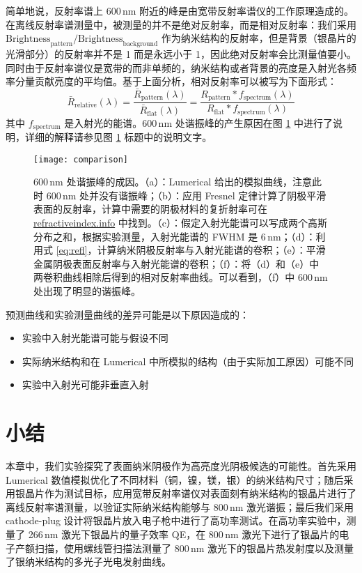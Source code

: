 简单地说，反射率谱上 600\,nm 附近的峰是由宽带反射率谱仪的工作原理造成的。在离线反射率谱测量中，被测量的并不是绝对反射率，而是相对反射率：我们采用 $\text{Brightness}_{\text{pattern}}/\text{Brightness}_{\text{background}}$ 作为纳米结构的反射率，但是背景（银晶片的光滑部分）的反射率并不是 1 而是永远小于 1，因此绝对反射率会比测量值要小。同时由于反射率谱仪是宽带的而非单频的，纳米结构或者背景的亮度是入射光各频率分量贡献亮度的平均值。基于上面分析，相对反射率可以被写为下面形式：
\begin{equation}
\label{eq:refl}
\bar{R}_{\text{relative}}(\lambda) = \dfrac{\bar{R}_{\text{pattern}}(\lambda)}{\bar{R}_{\text{flat}}(\lambda)} = \dfrac{R_{\text{pattern}}\ast f_{\text{spectrum}}(\lambda)}{R_{\text{flat}}\ast f_{\text{spectrum}}(\lambda)}
\end{equation}
其中 $f_{\text{spectrum}}$ 是入射光的能谱。600\,nm 处谐振峰的产生原因在图 \ref{fig:reason} 中进行了说明，详细的解释请参见图 \ref{fig:reason} 标题中的说明文字。
\begin{figure}[htbp]
\begin{center}
\texttt{[image: comparison]}
\caption{\label{fig:reason} 600\,nm 处谐振峰的成因。（a）：Lumerical 给出的模拟曲线，注意此时 600\,nm 处并没有谐振峰；（b）：应用 Fresnel 定律计算了阴极平滑表面的反射率，计算中需要的阴极材料的复折射率可在 \href{http://refractiveindex.info}{refractiveindex.info} 中找到。（c）：假定入射光能谱可以写成两个高斯分布之和，根据实验测量，入射光能谱的 FWHM 是 6\,nm；（d）：利用式 \ref{eq:refl}，计算纳米阴极反射率与入射光能谱的卷积；（e）：平滑金属阴极表面反射率与入射光能谱的卷积；（f）：将（d）和（e）中两卷积曲线相除后得到的相对反射率曲线。可以看到，（f）中 600\,nm 处出现了明显的谐振峰。}
\end{center}
\end{figure}
预测曲线和实验测量曲线的差异可能是以下原因造成的：
\begin{itemize}
\item 实验中入射光能谱可能与假设不同
\item 实际纳米结构和在 Lumerical 中所模拟的结构（由于实际加工原因）可能不同
\item 实验中入射光可能非垂直入射
\end{itemize}

\section{小结\label{sec:sum}}
本章中，我们实验探究了表面纳米阴极作为高亮度光阴极候选的可能性。首先采用 Lumerical 数值模拟优化了不同材料（铜，镍，镁，银）的纳米结构尺寸；随后采用银晶片作为测试目标，应用宽带反射率谱仪对表面刻有纳米结构的银晶片进行了离线反射率谱测量，以验证实际纳米结构能够与 800\,nm 激光谐振；最后我们采用 cathode-plug 设计将银晶片放入电子枪中进行了高功率测试。在高功率实验中，测量了 266\,nm 激光下银晶片的量子效率 QE，在 800\,nm 激光下进行了银晶片的电子产额扫描，使用螺线管扫描法测量了 800\,nm 激光下的银晶片热发射度以及测量了银纳米结构的多光子光电发射曲线。

